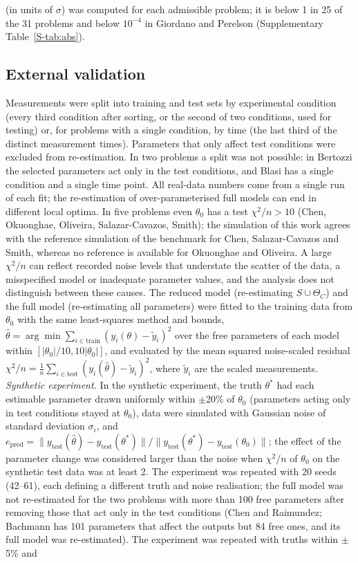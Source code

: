 \documentclass[pdflatex,sn-nature]{sn-jnl}
\theoremstyle{plain}
\begin{document}
(in units of $\sigma$) was computed for each admissible problem; it is below 1 in 25 of the 31 problems and below $10^{-4}$ in Giordano and Perelson (Supplementary Table~\ref{S-tab:abs}).

\subsection*{External validation}\label{met:validation}

Measurements were split into training and test sets by experimental condition (every third condition after sorting, or the second of two conditions, used for testing) or, for problems with a single condition, by time (the last third of the distinct measurement times). Parameters that only affect test conditions were excluded from re-estimation. In two problems a split was not possible: in Bertozzi the selected parameters act only in the test conditions, and Blasi has a single condition and a single time point. All real-data numbers come from a single run of each fit; the re-estimation of over-parameterised full models can end in different local optima\cite{bib52}. In five problems even $\theta_0$ has a test $\chi^2/n>10$ (Chen, Okuonghae, Oliveira, Salazar-Cavazos, Smith); the simulation of this work agrees with the reference simulation of the benchmark for Chen, Salazar-Cavazos and Smith, whereas no reference is available for Okuonghae and Oliveira. A large $\chi^2/n$ can reflect recorded noise levels that understate the scatter of the data, a misspecified model or inadequate parameter values, and the analysis does not distinguish between these causes. The reduced model (re-estimating $S\cup\Theta_C$) and the full model (re-estimating all parameters) were fitted to the training data from $\theta_0$ with the same least-squares method and bounds, $\hat\theta=\arg\min\sum_{i\in\mathrm{train}}(y_i(\theta)-\tilde y_i)^2$ over the free parameters of each model within $[|\theta_0|/10,10|\theta_0|]$, and evaluated by the mean squared noise-scaled residual $\chi^2/n=\frac{1}{n}\sum_{i\in\mathrm{test}}(y_i(\hat\theta)-\tilde y_i)^2$, where $\tilde y_i$ are the scaled measurements. \label{met:val-synth}\emph{Synthetic experiment.} In the synthetic experiment, the truth $\theta^\ast$ had each estimable parameter drawn uniformly within $\pm$20\% of $\theta_0$ (parameters acting only in test conditions stayed at $\theta_0$), data were simulated with Gaussian noise of standard deviation $\sigma_i$, and $e_{\mathrm{pred}}=\|y_{\mathrm{test}}(\hat\theta)-y_{\mathrm{test}}(\theta^\ast)\|/\|y_{\mathrm{test}}(\theta^\ast)-y_{\mathrm{test}}(\theta_0)\|$; the effect of the parameter change was considered larger than the noise when $\chi^2/n$ of $\theta_0$ on the synthetic test data was at least 2. The experiment was repeated with 20 seeds (42--61), each defining a different truth and noise realisation; the full model was not re-estimated for the two problems with more than 100 free parameters after removing those that act only in the test conditions (Chen and Raimundez; Bachmann has 101 parameters that affect the outputs but 84 free ones, and its full model was re-estimated). The experiment was repeated with truths within $\pm$5\% and 
\end{document}
